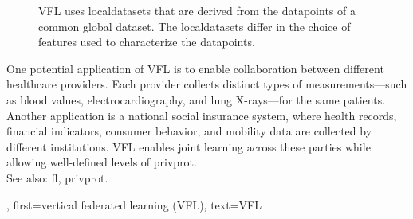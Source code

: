 {{\begin{figure}[H]
\begin{center}
			\end{center}
			\caption{VFL uses \glspl{localdataset} that are derived from the \glspl{datapoint} of a common global \gls{dataset}. 
				The \glspl{localdataset} differ in the choice of \glspl{feature} used to characterize the \glspl{datapoint}.\label{fig_vertical_FL_dict}}
		\end{figure}
		One potential application of VFL is to enable collaboration between 
		different healthcare providers. Each provider collects distinct types of measurements—such as blood 
		values, electrocardiography, and lung X-rays—for the same patients. Another application is a 
		national social insurance system, where health records, financial indicators, consumer behavior, 
		and mobility \gls{data} are collected by different institutions. VFL enables joint learning across 
		these parties while allowing well-defined levels of \gls{privprot}.
		\\
		See also: \gls{fl}, \gls{privprot}.},
	first={vertical federated learning (VFL)},
	text={VFL}
} 

